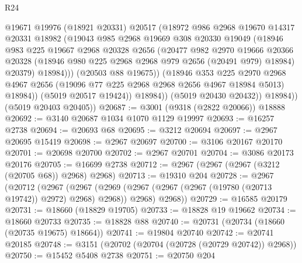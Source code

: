 \begin{lexlean}{R24}
\begin{coremodule}
                      @19671
                      @19976
                      (@18921 @20331)
                      @20517
                      (@18972
                        @986
                        @2968
                        @19670
                        @14317
                        @20331
                        @18982
                        (@19043
                          @985
                          @2968
                          @19669
                          @308
                          @20330
                          @19049
                          (@18946
                            @983
                            @225
                            @19667
                            @2968
                            @20328
                            @2656
                            (@20477
                              @982
                              @2970
                              @19666
                              @20366
                              @20328
                              (@18946 @980 @225 @2968 @2968 @979 @2656 (@20491 @979) @18984)
                              @20379)
                            @18984)))
                      (@20503 @88 @19675))
                    (@18946
                      @353
                      @225
                      @2970
                      @2968
                      @4967
                      @2656
                      (@19096 @77 @225 @2968 @2968 @2656 @4967 @18984 @5013)
                      @18984))
                  (@5019 @20517 @19424))
                @18984))
            (@5019 @20430 @20432))
          @18984))
      (@5019 @20403 @20405))
@20687 := @3001 (@9318 (@2822 @20066)) @18888
@20692 := @3140 @20687 @1034 @1070 @1129 @19997
@20693 := @16257 @2738
@20694 := @20693 @68
@20695 := @3212 @20694
@20697 := @2967 @20695 @15419
@20698 := @2967 @20697
@20700 := @3106 @20167 @20170
@20701 := @20698 @20700
@20702 := @2967 @20701
@20704 := @3086 @20173 @20176
@20705 := @16699 @2738
@20712 := @2967 (@2967 (@2967 (@3212 (@20705 @68)) @2968) @2968)
@20713 := @19310 @204
@20728 := @2967
    (@20712
      (@2967
        (@2967 (@2969 (@2967 (@2967 (@2967 (@19780 (@20713 @19742)) @2972) @2968) @2968)) @2968)
        @2968))
@20729 := @16585 @20179
@20731 := @18660 (@18829 @19705)
@20733 := @18828 @19 @19662
@20734 := @18660 @20733
@20735 := @18828 @88
@20740 := @20731 (@20734 (@18660 (@20735 @19675) @18664))
@20741 := @19804 @20740
@20742 := @20741 @20185
@20748 := @3151 (@20702 (@20704 (@20728 (@20729 @20742)) @2968))
@20750 := @15452 @5408 @2738
@20751 := @20750 @204

\end{coremodule}
\end{lexlean}
